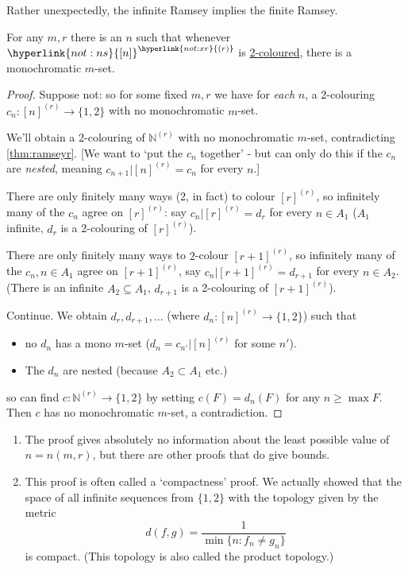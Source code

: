 \documentclass{article}
\begin{document}
Rather unexpectedly, the infinite Ramsey implies the finite Ramsey.
\begin{nthm}\label{thm:finiteramsey}
  For any $m,r$ there is an $n$ such that whenever $\hyperlink{not:ns}{[n]}^{\hyperlink{not:xr}{(r)}}$ is \hyperlink{def:2colouring}{2-coloured}, there is a monochromatic $m$-set.
\end{nthm}
\begin{proof}
  Suppose not: so for some fixed $m,r$ we have for \emph{each} $n$, a 2-colouring $c_n: [n]^{(r)} \to \{1,2\}$ with no monochromatic $m$-set.

  We'll obtain a 2-colouring of $\mathbb{N}^{(r)}$ with no monochromatic $m$-set, contradicting \cref{thm:ramseyr}.
  [We want to `put the $c_n$ together' - but can only do this if the $c_n$ are \emph{nested}, meaning $c_{n+1} | [n]^{(r)} = c_n$ for every $n$.]

  There are only finitely many ways (2, in fact) to colour $[r]^{(r)}$, so infinitely many of the $c_n$ agree on $[r]^{(r)}$: say $c_n | [r]^{(r)} = d_r$ for every $n \in A_1$ ($A_1$ infinite, $d_r$ is a 2-colouring of $[r]^{(r)}$).

  There are only finitely many ways to $2$-colour $[r+1]^{(r)}$, so infinitely many of the $c_n, n \in A_1$ agree on $[r+1]^{(r)}$, say $c_n | [r+1]^{(r)} = d_{r+1}$ for every $n \in A_2$.
  (There is an infinite $A_2 \subseteq A_1$, $d_{r+1}$ is a 2-colouring of $[r+1]^{(r)}$).

  Continue. We obtain $d_{r}, d_{r+1}, \dotsc$ (where $d_n: [n]^{(r)} \to \{1,2\}$) such that
  \begin{itemize}
    \item no $d_n$ has a mono $m$-set ($d_n = c_{n'} | [n]^{(r)}$ for some $n'$).
    \item The $d_n$ are nested (because $A_2 \subset A_1$ etc.)
  \end{itemize}
  so can find $c: \mathbb{N}^{(r)}\to \{1,2\}$ by setting $c(F) = d_n(F)$ for any $n \geq \max F$.
  Then $c$ has no monochromatic $m$-set, a contradiction.
\end{proof}

\begin{remark}\leavevmode
  \begin{enumerate}[1.]
    \item The proof gives absolutely no information about the least possible value of $n = n(m,r)$, but there are other proofs that do give bounds.
    \item This proof is often called a `compactness' proof. We actually showed that the space of all infinite sequences from $\{1,2\}$ with the topology given by the metric
      \begin{equation*}
        d(f,g) = \frac{1}{\min\{n : f_n \neq g_n\}}
      \end{equation*}
      is compact. (This topology is also called the product topology.)
  \end{enumerate}
\end{remark}
\end{document}
